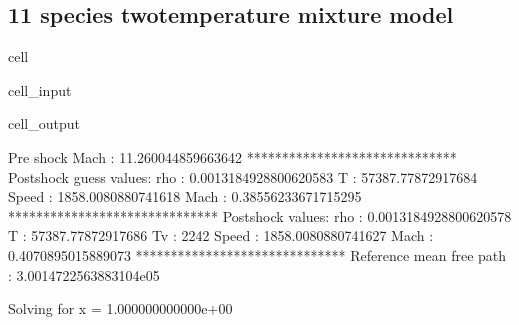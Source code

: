 \documentclass[letterpaper,10pt,english]{jupyterBook}
\begin{document}
\subsection{11 species two\sphinxhyphen{}temperature mixture model}
\label{\detokenize{Results/Results:id5}}
\begin{sphinxuseclass}{cell}\begin{sphinxVerbatimInput}

\begin{sphinxuseclass}{cell_input}
\begin{sphinxVerbatim}[commandchars=\\\{\}]
  

      
    
       

\end{sphinxVerbatim}

\end{sphinxuseclass}\end{sphinxVerbatimInput}
\begin{sphinxVerbatimOutput}

\begin{sphinxuseclass}{cell_output}
\begin{sphinxVerbatim}[commandchars=\\\{\}]
Pre shock Mach : 11.260044859663642
******************************
Post\PYGZhy{}shock guess values:
rho    : 0.0013184928800620583
T      : 57387.77872917684
Speed  : 1858.0080880741618
Mach   : 0.38556233671715295
******************************
Post\PYGZhy{}shock values:
rho    : 0.0013184928800620578
T      : 57387.77872917686
Tv     : 2242
Speed  : 1858.0080880741627
Mach   : 0.4070895015889073
******************************
Reference mean free path : 3.0014722563883104e\PYGZhy{}05

Solving for x = 1.000000000000e+00
\end{sphinxVerbatim}

\end{sphinxuseclass}\end{sphinxVerbatimOutput}

\end{sphinxuseclass}
\end{document}
